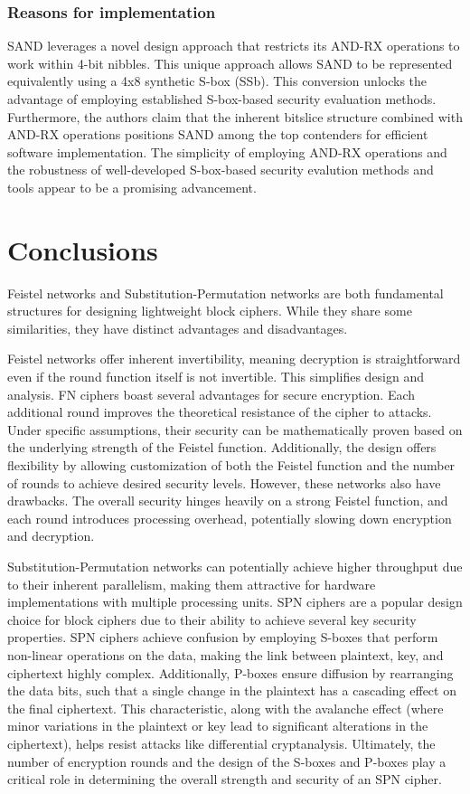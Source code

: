 \documentclass[conference]{IEEEtran}
\begin{document}
\subsubsection{Reasons for implementation}
SAND leverages a novel design approach that restricts its AND-RX operations to work within 4-bit nibbles. This unique approach allows SAND to be represented equivalently using a 4x8 synthetic S-box (SSb). This conversion unlocks the advantage of employing established S-box-based security evaluation methods. Furthermore, the authors claim that the inherent bitslice structure combined with AND-RX operations positions SAND among the top contenders for efficient software implementation. The simplicity of employing AND-RX operations and the robustness of well-developed S-box-based security evalution methods and tools appear to be a promising advancement.

\section{Conclusions}
Feistel networks and Substitution-Permutation networks are both fundamental structures for designing lightweight block ciphers. While they share some similarities, they have distinct advantages and disadvantages.

Feistel networks offer inherent invertibility, meaning decryption is straightforward even if the round function itself is not invertible. This simplifies design and analysis. FN ciphers boast several advantages for secure encryption. Each additional round improves the theoretical resistance of the cipher to attacks. Under specific assumptions, their security can be mathematically proven based on the underlying strength of the Feistel function. Additionally, the design offers flexibility by allowing customization of both the Feistel function and the number of rounds to achieve desired security levels. However, these networks also have drawbacks. The overall security hinges heavily on a strong Feistel function, and each round introduces processing overhead, potentially slowing down encryption and decryption.

Substitution-Permutation networks can potentially achieve higher throughput due to their inherent parallelism, making them attractive for hardware implementations with multiple processing units. SPN ciphers are a popular design choice for block ciphers due to their ability to achieve several key security properties.  SPN ciphers achieve confusion by employing S-boxes that perform non-linear operations on the data, making the link between plaintext, key, and ciphertext highly complex. Additionally, P-boxes ensure diffusion by rearranging the data bits, such that a single change in the plaintext has a cascading effect on the final ciphertext. This characteristic, along with the avalanche effect (where minor variations in the plaintext or key lead to significant alterations in the ciphertext), helps resist attacks like differential cryptanalysis. Ultimately, the number of encryption rounds and the design of the S-boxes and P-boxes play a critical role in determining the overall strength and security of an SPN cipher.
\end{document}
